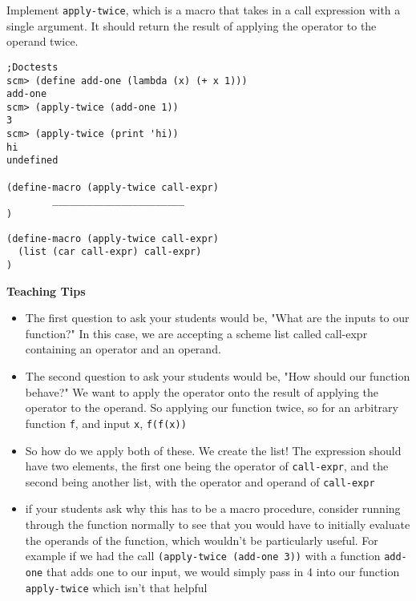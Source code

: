 \begin{blocksection}

\question Implement \texttt{apply-twice}, which is a macro that takes in a call expression with
a single argument. It should return the result of applying the operator to the operand twice.

\begin{lstlisting}
;Doctests
scm> (define add-one (lambda (x) (+ x 1)))
add-one
scm> (apply-twice (add-one 1))
3
scm> (apply-twice (print 'hi))
hi
undefined

(define-macro (apply-twice call-expr)
		_______________________
)

\end{lstlisting}

\begin{solution}[0.5in]
\begin{lstlisting}
(define-macro (apply-twice call-expr)
  (list (car call-expr) call-expr)
)

\end{lstlisting}
\end{solution}
\end{blocksection}

\begin{guide}
\begin{blocksection}
\textbf{Teaching Tips}
\begin{itemize}
  \item The first question to ask your students would be, "What are the inputs to our function?" In this case, we are accepting a scheme list called call-expr containing an operator and an operand.
  \item The second question to ask your students would be, "How should our function behave?" We want to apply the operator onto the result of applying the operator to the operand. So applying our function twice, so for an arbitrary function \lstinline{f}, and input \lstinline{x}, \lstinline{f(f(x))}
  \item So how do we apply both of these. We create the list! The expression should have two elements, the first one being the operator of \lstinline{call-expr}, and the second being another list, with the operator and operand of \lstinline{call-expr}
  \item if your students ask why this has to be a macro procedure, consider running through the function normally to see that you would have to initially evaluate the operands of the function, which wouldn't be particularly useful. For example if we had the call \lstinline{(apply-twice (add-one 3))} with a function \lstinline{add-one} that adds one to our input, we would simply pass in 4 into our function \lstinline{apply-twice} which isn't that helpful
\end{itemize}

\end{blocksection}
\end{guide}
